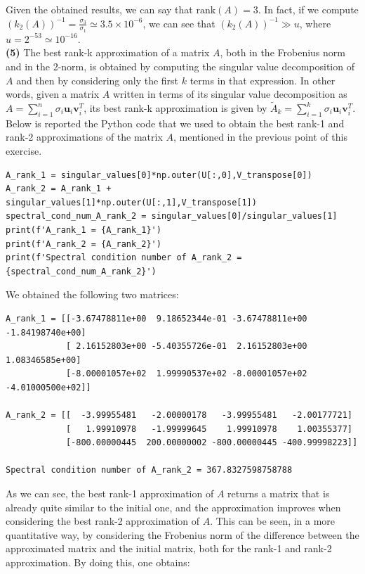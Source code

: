 \documentclass[a4paper,11pt]{article}
\begin{document}
\noindent Given the obtained results, we can say that $\text{rank}(A)=3$. In fact, if we compute $(k_{2}(A))^{-1} = \frac{\sigma_{3}}{\sigma_{1}}\simeq 3.5 \times 10^{-6}$, we can see that $(k_{2}(A))^{-1} \gg u$, where $u = 2^{-53} \simeq 10^{-16}$.\\

\noindent \textbf{(5)} The best rank-k approximation of a matrix $A$, both in the Frobenius norm and in the 2-norm, is obtained by computing the singular value decomposition of $A$ and then by considering only the first $k$ terms in that expression. In other words, given a matrix $A$ written in terms of its singular value decomposition as $A = \sum_{i=1}^{n}\sigma_{i}\textbf{u}_{i}\textbf{v}_{i}^{T}$, its best rank-k approximation is given by $\tilde{A}_{k} = \sum_{i=1}^{k}\sigma_{i}\textbf{u}_{i}\textbf{v}_{i}^{T}$. Below is reported the Python code that we used to obtain the best rank-1 and rank-2 approximations of the matrix $A$, mentioned in the previous point of this exercise.

\begin{verbatim}
A_rank_1 = singular_values[0]*np.outer(U[:,0],V_transpose[0])
A_rank_2 = A_rank_1 + singular_values[1]*np.outer(U[:,1],V_transpose[1])
spectral_cond_num_A_rank_2 = singular_values[0]/singular_values[1]
print(f'A_rank_1 = {A_rank_1}')
print(f'A_rank_2 = {A_rank_2}')
print(f'Spectral condition number of A_rank_2 = {spectral_cond_num_A_rank_2}')
\end{verbatim}

\noindent We obtained the following two matrices:

\begin{verbatim}
A_rank_1 = [[-3.67478811e+00  9.18652344e-01 -3.67478811e+00 -1.84198740e+00]
            [ 2.16152803e+00 -5.40355726e-01  2.16152803e+00  1.08346585e+00]
            [-8.00001057e+02  1.99990537e+02 -8.00001057e+02 -4.01000500e+02]]

A_rank_2 = [[  -3.99955481   -2.00000178   -3.99955481   -2.00177721]
            [   1.99910978   -1.99999645    1.99910978    1.00355377]
            [-800.00000445  200.00000002 -800.00000445 -400.99998223]]
            
Spectral condition number of A_rank_2 = 367.8327598758788
\end{verbatim}

\noindent As we can see, the best rank-1 approximation of $A$ returns a matrix that is already quite similar to the initial one, and the approximation improves when considering the best rank-2 approximation of $A$. This can be seen, in a more quantitative way, by considering the Frobenius norm of the difference between the approximated matrix and the initial matrix, both for the rank-1 and rank-2 approximation. By doing this, one obtains:
\end{document}
